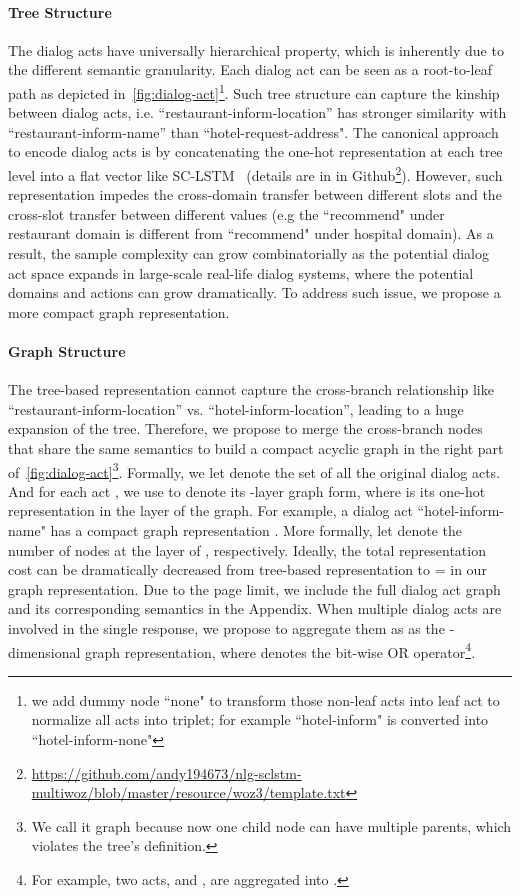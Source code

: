 \documentclass[11pt,a4paper]{article}
\begin{document}
\paragraph{Tree Structure}
The dialog acts
have universally hierarchical property, which is inherently due to the different semantic granularity. Each dialog act can be seen as a root-to-leaf path as depicted in~\autoref{fig:dialog-act}\footnote{we add dummy node ``none" to transform those non-leaf acts into leaf act to normalize all acts into triplet; for example ``hotel-inform" is converted into ``hotel-inform-none"}.  Such tree structure can capture the kinship between dialog acts, i.e. ``restaurant-inform-location'' has stronger similarity with ``restaurant-inform-name'' than ``hotel-request-address".  The canonical  approach to encode dialog acts is by concatenating the one-hot representation at each tree level into a flat vector like SC-LSTM~\cite{DBLP:conf/emnlp/WenGMSVY15,DBLP:conf/emnlp/BudzianowskiWTC18}  (details are in in Github\footnote{\url{https://github.com/andy194673/nlg-sclstm-multiwoz/blob/master/resource/woz3/template.txt}}). However, such representation impedes the cross-domain transfer between different slots and the cross-slot transfer between different values (e.g the ``recommend" under restaurant domain is different from ``recommend" under hospital domain). As a result, the sample complexity can grow combinatorially as the potential dialog act space expands in large-scale real-life dialog systems, where the potential domains and actions can grow dramatically. To address such issue, we propose a more compact graph representation.

\paragraph{Graph Structure}
The tree-based representation cannot capture the cross-branch relationship like ``restaurant-inform-location'' vs. ``hotel-inform-location'', leading to a huge expansion of the tree. Therefore, we propose to merge the cross-branch nodes that share the same semantics to build a compact acyclic graph in the right part of~\autoref{fig:dialog-act}\footnote{We call it graph because now one child node can have multiple parents, which violates the tree's definition.}. Formally, we let  denote the set of all the original dialog acts. And for each act , we use  to denote its -layer graph form, where  is its one-hot representation in the  layer of the graph. For example, a dialog act ``hotel-inform-name" has a compact graph representation . More formally, let  denote the number of nodes at the layer of , respectively. Ideally, the total representation cost can be dramatically decreased from  tree-based representation to = in our graph representation. Due to the page limit, we include the full dialog act graph and its corresponding semantics in the Appendix. When multiple dialog acts  are involved in the single response, we propose to aggregate them as  as the -dimensional graph representation, where  denotes the bit-wise OR operator\footnote{For example, two acts,  and , are aggregated into .}.
\end{document}
